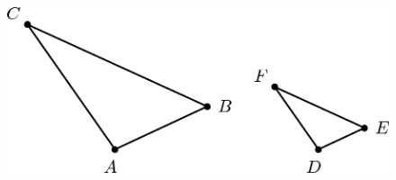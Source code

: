       
      \label{m39405*id78214}
        
    \setcounter{subfigure}{0}


	\begin{figure}[H] %
    \begin{center}
    \label{m39405*id78218!!!underscore!!!media}\label{m39405*id78218!!!underscore!!!printimage}\includegraphics{col11306.imgs/m39405_MG10C15_001.png} %
        
      \vspace{2pt}
    \vspace{.1in}
    
    \end{center}

 \end{figure}   

    \addtocounter{footnote}{-0}
    
